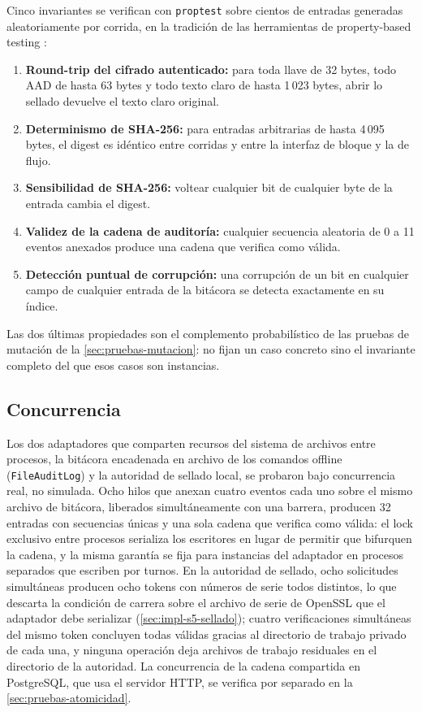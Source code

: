 Cinco invariantes se verifican con \texttt{proptest} sobre cientos de entradas generadas aleatoriamente por corrida, en la tradición de las herramientas de property-based testing \cite{claessen2000}:

\begin{enumerate}
  \item \textbf{Round-trip del cifrado autenticado:} para toda llave de 32 bytes, todo AAD de hasta 63 bytes y todo texto claro de hasta 1\,023 bytes, abrir lo sellado devuelve el texto claro original.
  \item \textbf{Determinismo de SHA-256:} para entradas arbitrarias de hasta 4\,095 bytes, el digest es idéntico entre corridas y entre la interfaz de bloque y la de flujo.
  \item \textbf{Sensibilidad de SHA-256:} voltear cualquier bit de cualquier byte de la entrada cambia el digest.
  \item \textbf{Validez de la cadena de auditoría:} cualquier secuencia aleatoria de 0 a 11 eventos anexados produce una cadena que verifica como válida.
  \item \textbf{Detección puntual de corrupción:} una corrupción de un bit en cualquier campo de cualquier entrada de la bitácora se detecta exactamente en su índice.
\end{enumerate}

Las dos últimas propiedades son el complemento probabilístico de las pruebas de mutación de la \cref{sec:pruebas-mutacion}: no fijan un caso concreto sino el invariante completo del que esos casos son instancias.

\subsection{Concurrencia}\label{sec:pruebas-concurrencia}

Los dos adaptadores que comparten recursos del sistema de archivos entre procesos, la bitácora encadenada en archivo de los comandos offline (\texttt{File\allowbreak Audit\allowbreak Log}) y la autoridad de sellado local, se probaron bajo concurrencia real, no simulada. Ocho hilos que anexan cuatro eventos cada uno sobre el mismo archivo de bitácora, liberados simultáneamente con una barrera, producen 32 entradas con secuencias únicas y una sola cadena que verifica como válida: el lock exclusivo entre procesos serializa los escritores en lugar de permitir que bifurquen la cadena, y la misma garantía se fija para instancias del adaptador en procesos separados que escriben por turnos. En la autoridad de sellado, ocho solicitudes simultáneas producen ocho tokens con números de serie todos distintos, lo que descarta la condición de carrera sobre el archivo de serie de OpenSSL que el adaptador debe serializar (\cref{sec:impl-s5-sellado}); cuatro verificaciones simultáneas del mismo token concluyen todas válidas gracias al directorio de trabajo privado de cada una, y ninguna operación deja archivos de trabajo residuales en el directorio de la autoridad. La concurrencia de la cadena compartida en PostgreSQL, que usa el servidor HTTP, se verifica por separado en la \cref{sec:pruebas-atomicidad}.


